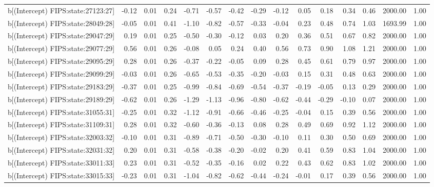 \begin{table}[ht]
\begin{tabular}{rrrrrrrrrrrrrrr}
  b[(Intercept) FIPS:state:27123:27] & -0.12 & 0.01 & 0.24 & -0.71 & -0.57 & -0.42 & -0.29 & -0.12 & 0.05 & 0.18 & 0.34 & 0.46 & 2000.00 & 1.00 \\ 
  b[(Intercept) FIPS:state:28049:28] & -0.05 & 0.01 & 0.41 & -1.10 & -0.82 & -0.57 & -0.33 & -0.04 & 0.23 & 0.48 & 0.74 & 1.03 & 1693.99 & 1.00 \\ 
  b[(Intercept) FIPS:state:29047:29] & 0.19 & 0.01 & 0.25 & -0.50 & -0.30 & -0.12 & 0.03 & 0.20 & 0.36 & 0.51 & 0.67 & 0.82 & 2000.00 & 1.00 \\ 
  b[(Intercept) FIPS:state:29077:29] & 0.56 & 0.01 & 0.26 & -0.08 & 0.05 & 0.24 & 0.40 & 0.56 & 0.73 & 0.90 & 1.08 & 1.21 & 2000.00 & 1.00 \\ 
  b[(Intercept) FIPS:state:29095:29] & 0.28 & 0.01 & 0.26 & -0.37 & -0.22 & -0.05 & 0.09 & 0.28 & 0.45 & 0.61 & 0.79 & 0.97 & 2000.00 & 1.00 \\ 
  b[(Intercept) FIPS:state:29099:29] & -0.03 & 0.01 & 0.26 & -0.65 & -0.53 & -0.35 & -0.20 & -0.03 & 0.15 & 0.31 & 0.48 & 0.63 & 2000.00 & 1.00 \\ 
  b[(Intercept) FIPS:state:29183:29] & -0.37 & 0.01 & 0.25 & -0.99 & -0.84 & -0.69 & -0.54 & -0.37 & -0.19 & -0.05 & 0.13 & 0.29 & 2000.00 & 1.00 \\ 
  b[(Intercept) FIPS:state:29189:29] & -0.62 & 0.01 & 0.26 & -1.29 & -1.13 & -0.96 & -0.80 & -0.62 & -0.44 & -0.29 & -0.10 & 0.07 & 2000.00 & 1.00 \\ 
  b[(Intercept) FIPS:state:31055:31] & -0.25 & 0.01 & 0.32 & -1.12 & -0.91 & -0.66 & -0.46 & -0.25 & -0.04 & 0.15 & 0.39 & 0.56 & 2000.00 & 1.00 \\ 
  b[(Intercept) FIPS:state:31109:31] & 0.28 & 0.01 & 0.32 & -0.60 & -0.36 & -0.13 & 0.08 & 0.28 & 0.49 & 0.69 & 0.92 & 1.12 & 2000.00 & 1.00 \\ 
  b[(Intercept) FIPS:state:32003:32] & -0.10 & 0.01 & 0.31 & -0.89 & -0.71 & -0.50 & -0.30 & -0.10 & 0.11 & 0.30 & 0.50 & 0.69 & 2000.00 & 1.00 \\ 
  b[(Intercept) FIPS:state:32031:32] & 0.20 & 0.01 & 0.31 & -0.58 & -0.38 & -0.20 & -0.02 & 0.20 & 0.41 & 0.59 & 0.83 & 1.04 & 2000.00 & 1.00 \\ 
  b[(Intercept) FIPS:state:33011:33] & 0.23 & 0.01 & 0.31 & -0.52 & -0.35 & -0.16 & 0.02 & 0.22 & 0.43 & 0.62 & 0.83 & 1.02 & 2000.00 & 1.00 \\ 
  b[(Intercept) FIPS:state:33015:33] & -0.23 & 0.01 & 0.31 & -1.04 & -0.82 & -0.62 & -0.44 & -0.24 & -0.01 & 0.17 & 0.39 & 0.56 & 2000.00 & 1.00 \\ 

\end{tabular}
\end{table}
